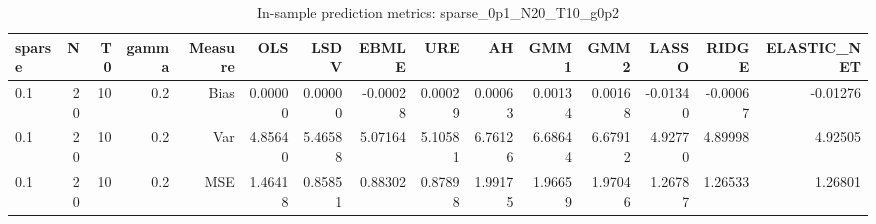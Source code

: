 \begin{table}[!htbp]\centering
\caption{In-sample prediction metrics: sparse_0p1_N20_T10_g0p2}
\label{tab:table2_sparse_0p1_N20_T10_g0p2}
\begin{tabular}{lrrrrrrrrrrrrrr}
\hline
sparse & N & T0 & gamma & Measure & OLS & LSDV & EBMLE & URE & AH & GMM1 & GMM2 & LASSO & RIDGE & ELASTIC_NET \\
\hline
0.1 & 20 & 10 & 0.2 & Bias & 0.00000 & 0.00000 & -0.00028 & 0.00029 & 0.00063 & 0.00134 & 0.00168 & -0.01340 & -0.00067 & -0.01276 \\
0.1 & 20 & 10 & 0.2 & Var & 4.85640 & 5.46588 & 5.07164 & 5.10581 & 6.76126 & 6.68644 & 6.67912 & 4.92770 & 4.89998 & 4.92505 \\
0.1 & 20 & 10 & 0.2 & MSE & 1.46418 & 0.85851 & 0.88302 & 0.87898 & 1.99175 & 1.96659 & 1.97046 & 1.26787 & 1.26533 & 1.26801 \\
\hline
\end{tabular}
\end{table}

